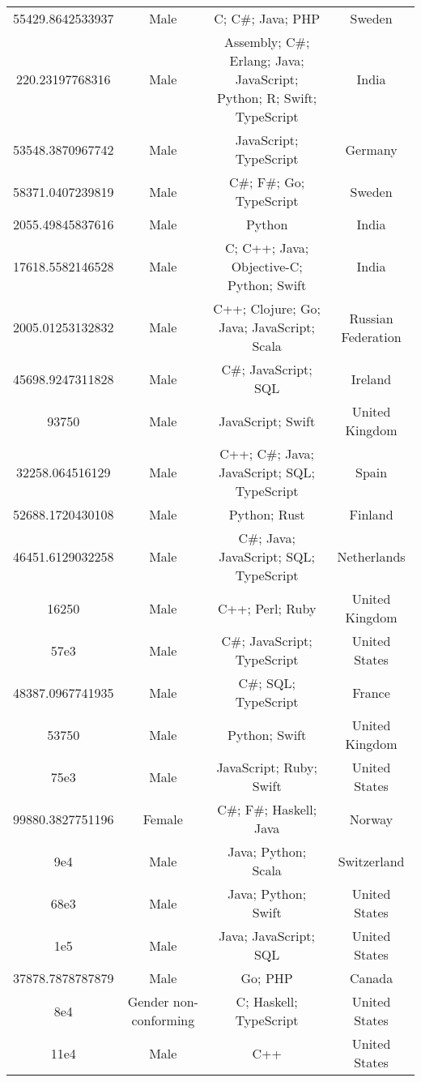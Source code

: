 \begin{center}
\begin{tabular}{ |c|c|c|c| }
55429.8642533937  &  Male  &  C; C\#; Java; PHP  &  Sweden  \\ 
220.23197768316  &  Male  &  Assembly; C\#; Erlang; Java; JavaScript; Python; R; Swift; TypeScript  &  India  \\ 
53548.3870967742  &  Male  &  JavaScript; TypeScript  &  Germany  \\ 
58371.0407239819  &  Male  &  C\#; F\#; Go; TypeScript  &  Sweden  \\ 
2055.49845837616  &  Male  &  Python  &  India  \\ 
17618.5582146528  &  Male  &  C; C++; Java; Objective-C; Python; Swift  &  India  \\ 
2005.01253132832  &  Male  &  C++; Clojure; Go; Java; JavaScript; Scala  &  Russian Federation  \\ 
45698.9247311828  &  Male  &  C\#; JavaScript; SQL  &  Ireland  \\ 
93750  &  Male  &  JavaScript; Swift  &  United Kingdom  \\ 
32258.064516129  &  Male  &  C++; C\#; Java; JavaScript; SQL; TypeScript  &  Spain  \\ 
52688.1720430108  &  Male  &  Python; Rust  &  Finland  \\ 
46451.6129032258  &  Male  &  C\#; Java; JavaScript; SQL; TypeScript  &  Netherlands  \\ 
16250  &  Male  &  C++; Perl; Ruby  &  United Kingdom  \\ 
57e3  &  Male  &  C\#; JavaScript; TypeScript  &  United States  \\ 
48387.0967741935  &  Male  &  C\#; SQL; TypeScript  &  France  \\ 
53750  &  Male  &  Python; Swift  &  United Kingdom  \\ 
75e3  &  Male  &  JavaScript; Ruby; Swift  &  United States  \\ 
99880.3827751196  &  Female  &  C\#; F\#; Haskell; Java  &  Norway  \\ 
9e4  &  Male  &  Java; Python; Scala  &  Switzerland  \\ 
68e3  &  Male  &  Java; Python; Swift  &  United States  \\ 
1e5  &  Male  &  Java; JavaScript; SQL  &  United States  \\ 
37878.7878787879  &  Male  &  Go; PHP  &  Canada  \\ 
8e4  &  Gender non-conforming  &  C; Haskell; TypeScript  &  United States  \\ 
11e4  &  Male  &  C++  &  United States  \\ 

\end{tabular}
\end{center}
